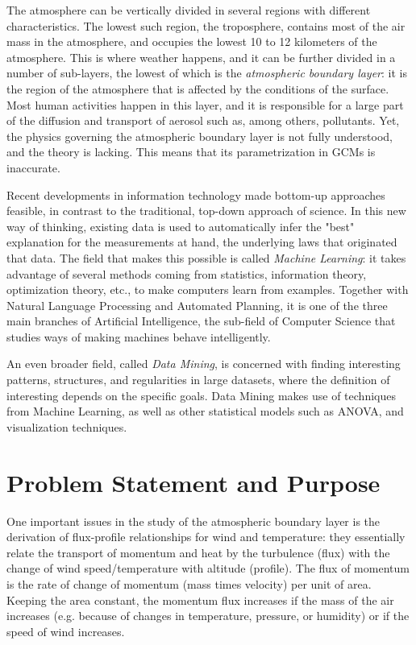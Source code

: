 \documentclass[a4paper,11pt]{kth-mag}
\begin{document}
The atmosphere can be vertically divided in several regions with different characteristics. The lowest such region, the troposphere, contains most of the air mass in the atmosphere, and occupies the lowest 10 to 12 kilometers of the atmosphere. This is where weather happens, and it can be further divided in a number of sub-layers, the lowest of which is the \emph{atmospheric boundary layer}: it is the region of the atmosphere that is affected by the conditions of the surface. Most human activities happen in this layer, and it is responsible for a large part of the diffusion and transport of aerosol such as, among others, pollutants. Yet, the physics governing the atmospheric boundary layer is not fully understood, and the theory is lacking. This means that its parametrization in GCMs is inaccurate.

Recent developments in information technology made bottom-up approaches feasible, in contrast to the traditional, top-down approach of science. In this new way of thinking, existing data is used to automatically infer the "best" explanation for the measurements at hand, the underlying laws that originated that data. The field that makes this possible is called \emph{Machine Learning}: it takes advantage of several methods coming from statistics, information theory, optimization theory, etc., to make computers learn from examples. Together with Natural Language Processing and Automated Planning, it is one of the three main branches of Artificial Intelligence, the sub-field of Computer Science that studies ways of making machines behave intelligently.

An even broader field, called \emph{Data Mining}, is concerned with finding interesting patterns, structures, and regularities in large datasets, where the definition of interesting depends on the specific goals. Data Mining makes use of techniques from Machine Learning, as well as other statistical models such as ANOVA, and visualization techniques.

\section{Problem Statement and Purpose}
\label{sec:problem}
One important issues in the study of the atmospheric boundary layer is the derivation of flux-profile relationships for wind and temperature: they essentially relate the transport of momentum and heat by the turbulence (flux) with the change of wind speed/temperature with altitude (profile). The flux of momentum is the rate of change of momentum (mass times velocity) per unit of area. Keeping the area constant, the momentum flux increases if the mass of the air increases (e.g. because of changes in temperature, pressure, or humidity) or if the speed of wind increases.
\end{document}

